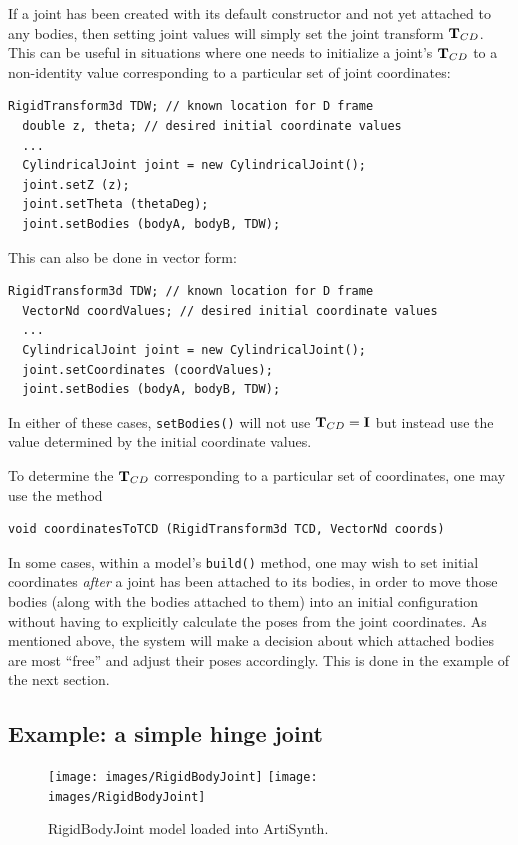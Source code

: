 If a joint has been created with its default constructor and not yet
attached to any bodies, then setting joint values will simply set the
joint transform ${\bf T}_{CD}$. This can be useful in situations where one
needs to initialize a joint's ${\bf T}_{CD}$ to a non-identity value
corresponding to a particular set of joint coordinates:
%
\begin{lstlisting}[]
  RigidTransform3d TDW; // known location for D frame
  double z, theta; // desired initial coordinate values
  ...
  CylindricalJoint joint = new CylindricalJoint();
  joint.setZ (z);
  joint.setTheta (thetaDeg);
  joint.setBodies (bodyA, bodyB, TDW);
\end{lstlisting}
%
This can also be done in vector form:
%
\begin{lstlisting}[]
  RigidTransform3d TDW; // known location for D frame
  VectorNd coordValues; // desired initial coordinate values
  ...
  CylindricalJoint joint = new CylindricalJoint();
  joint.setCoordinates (coordValues);
  joint.setBodies (bodyA, bodyB, TDW);
\end{lstlisting}
%
In either of these cases, {\tt setBodies()} will not use ${\bf T}_{CD}
= {\bf I}$ but instead use the value determined by the initial coordinate
values.

To determine the ${\bf T}_{CD}$ corresponding to a particular set of
coordinates, one may use the method
%
\begin{lstlisting}[]
  void coordinatesToTCD (RigidTransform3d TCD, VectorNd coords)
\end{lstlisting}
%

In some cases, within a model's {\tt build()} method, one may wish to
set initial coordinates {\it after} a joint has been attached to its
bodies, in order to move those bodies (along with the bodies attached
to them) into an initial configuration without having to explicitly
calculate the poses from the joint coordinates. As mentioned
above, the system will make a decision about which attached bodies are
most ``free'' and adjust their poses accordingly. This is done in the
example of the next section.

\subsection{Example: a simple hinge joint}
\label{RigidBodyJoint:sec}

\begin{figure}[ht]
\begin{center}
\iflatexml
 \texttt{[image: images/RigidBodyJoint]}
\else
 \texttt{[image: images/RigidBodyJoint]}
\fi
\end{center}
\caption{RigidBodyJoint model loaded into ArtiSynth.}
\label{RigidBodyJoint:fig}
\end{figure}

